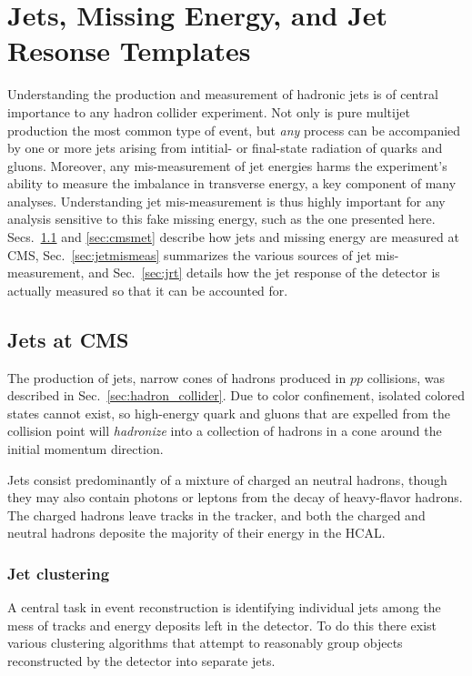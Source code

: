 \chapter{Jets, Missing Energy, and Jet Resonse Templates}

Understanding the production and measurement of hadronic jets is 
of central importance to any hadron collider experiment.
Not only is pure multijet production the most common type of event,
but \textit{any} process can be accompanied by one or more jets
arising from intitial- or final-state radiation of quarks and gluons.
Moreover, any mis-measurement of jet energies harms the experiment's 
ability to measure the imbalance in transverse energy, a key component
of many analyses. Understanding jet mis-measurement is thus highly important
for any analysis sensitive to this fake missing energy, such as the
one presented here.
Secs.~\ref{sec:cmsjet} and \ref{sec:cmsmet}
describe how jets and missing energy are measured at CMS, 
Sec.~\ref{sec:jetmismeas} summarizes the various sources of
jet mis-measurement, and Sec.~\ref{sec:jrt} details how
the jet response of the detector is actually measured
so that it can be accounted for.

\section{Jets at CMS}
\label{sec:cmsjet}

The production of jets, narrow cones of hadrons produced
in $pp$ collisions, was described in Sec.~\ref{sec:hadron_collider}.
Due to color confinement, isolated colored states cannot exist,
so high-energy quark and gluons that are expelled from the collision
point will \textit{hadronize} into a collection of hadrons in a 
cone around the initial momentum direction.

Jets consist predominantly of a mixture of charged an neutral 
hadrons, though they may also contain photons or leptons from
the decay of heavy-flavor hadrons. The charged hadrons
leave tracks in the tracker, and both the charged and neutral
hadrons deposite the majority of their energy in the HCAL.

\subsection{Jet clustering}
\label{sec:jetcluster}
A central task in event reconstruction is identifying individual
jets among the mess of tracks and energy deposits left
in the detector. To do this there exist various clustering algorithms
that attempt to reasonably group objects reconstructed by the detector
into separate jets.

